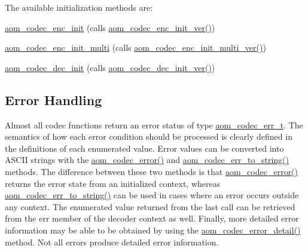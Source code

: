 The available initialization methods are\+: \begin{DoxyItemize}
\item \hyperlink{group__encoder_gaade68a7d33d30f97dc9a596aa5e065d8}{aom\+\_\+codec\+\_\+enc\+\_\+init} (calls \hyperlink{group__encoder_ga205cf6f9460f4b4a842872012ef6fb0c}{aom\+\_\+codec\+\_\+enc\+\_\+init\+\_\+ver()}) \item \hyperlink{group__encoder_ga4410c689b0f8d0b75aca881ff7b25253}{aom\+\_\+codec\+\_\+enc\+\_\+init\+\_\+multi} (calls \hyperlink{group__encoder_gad3dfb2298402298abadb2c1b059b5f0b}{aom\+\_\+codec\+\_\+enc\+\_\+init\+\_\+multi\+\_\+ver()}) \item \hyperlink{group__decoder_gafdbfca65b19ab1f6d72b32cd01753b9b}{aom\+\_\+codec\+\_\+dec\+\_\+init} (calls \hyperlink{group__decoder_gab2bfd2f5517b9452d2c71b7c2b2e8e8d}{aom\+\_\+codec\+\_\+dec\+\_\+init\+\_\+ver()})\end{DoxyItemize}
\hypertarget{usage_usage_errors}{}\subsection{Error Handling}\label{usage_usage_errors}
Almost all codec functions return an error status of type \hyperlink{group__codec_gaaae61e0f8663e6137f1e228757248e7c}{aom\+\_\+codec\+\_\+err\+\_\+t}. The semantics of how each error condition should be processed is clearly defined in the definitions of each enumerated value. Error values can be converted into A\+S\+C\+II strings with the \hyperlink{group__codec_ga50949c0854605c722832bbfb0803f5f4}{aom\+\_\+codec\+\_\+error()} and \hyperlink{group__codec_ga83c6525528574d1a88e73a9f605c9115}{aom\+\_\+codec\+\_\+err\+\_\+to\+\_\+string()} methods. The difference between these two methods is that \hyperlink{group__codec_ga50949c0854605c722832bbfb0803f5f4}{aom\+\_\+codec\+\_\+error()} returns the error state from an initialized context, whereas \hyperlink{group__codec_ga83c6525528574d1a88e73a9f605c9115}{aom\+\_\+codec\+\_\+err\+\_\+to\+\_\+string()} can be used in cases where an error occurs outside any context. The enumerated value returned from the last call can be retrieved from the {\ttfamily err} member of the decoder context as well. Finally, more detailed error information may be able to be obtained by using the \hyperlink{group__codec_ga43a70562598b485685794a4e9d9d53f7}{aom\+\_\+codec\+\_\+error\+\_\+detail()} method. Not all errors produce detailed error information.

